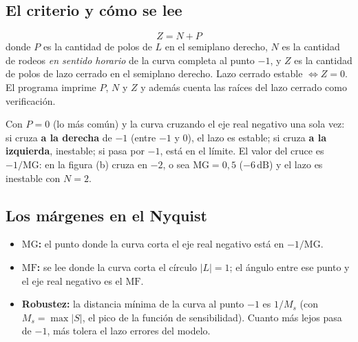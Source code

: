 \documentclass[11pt,a4paper]{article}
\newcommand{\dB}{\,\mathrm{dB}}
\newcommand{\MF}{\mathrm{MF}}
\newcommand{\MG}{\mathrm{MG}}
\begin{document}
\subsection{El criterio y cómo se lee}
\[
Z = N + P
\]
donde $P$ es la cantidad de polos de $L$ en el semiplano derecho, $N$ es la cantidad de rodeos \emph{en sentido horario}
de la curva completa al punto $-1$, y $Z$ es la cantidad de polos de lazo cerrado en el semiplano derecho. Lazo cerrado
estable $\iff Z=0$. El programa imprime $P$, $N$ y $Z$ y además cuenta las raíces del lazo cerrado como verificación.

\begin{regla}
Con $P=0$ (lo más común) y la curva cruzando el eje real negativo una sola vez: si cruza \textbf{a la derecha} de $-1$
(entre $-1$ y $0$), el lazo es estable; si cruza \textbf{a la izquierda}, inestable; si pasa por $-1$, está en el
límite. El valor del cruce es $-1/\MG$: en la figura (b) cruza en $-2$, o sea $\MG=0{,}5$ ($-6\dB$) y el lazo es inestable
con $N=2$.
\end{regla}

\subsection{Los márgenes en el Nyquist}
\begin{itemize}
\item \textbf{$\MG$:} el punto donde la curva corta el eje real negativo está en $-1/\MG$.
\item \textbf{$\MF$:} se lee donde la curva corta el círculo $|L|=1$; el ángulo entre ese punto y el eje real negativo es el
 $\MF$.
\item \textbf{Robustez:} la distancia mínima de la curva al punto $-1$ es $1/M_s$ (con $M_s=\max|S|$, el pico de la
 función de sensibilidad). Cuanto más lejos pasa de $-1$, más tolera el lazo errores del modelo.
\end{itemize}
\end{document}
